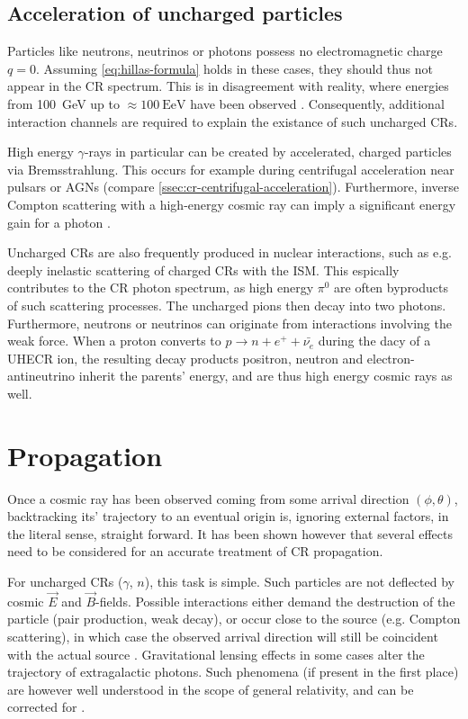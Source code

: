 \subsection{Acceleration of uncharged particles}
\label{ssec:cr-uncharged-acceleration}

Particles like neutrons, neutrinos or photons possess no electromagnetic charge $q = 0$. Assuming \autoref{eq:hillas-formula} holds in these cases, they 
should thus not appear in the CR spectrum. This is in disagreement with reality, where energies from \SI{100}{\giga\electronvolt} up to 
$\approx\SI{100}{\exa\electronvolt}$ have been observed \cite{abeysekara2018very, ishihara2016extremely}. Consequently, additional interaction channels are 
required to explain the existance of such uncharged CRs.

High energy $\gamma$-rays in particular can be created by accelerated, charged particles via Bremsstrahlung. This occurs for example during centrifugal 
acceleration near pulsars or AGNs (compare \autoref{ssec:cr-centrifugal-acceleration}). Furthermore, inverse Compton scattering with a high-energy cosmic ray can 
imply a significant energy gain for a photon \cite{jones1965inverse}.

Uncharged CRs are also frequently produced in nuclear interactions, such as e.g. deeply inelastic scattering of charged CRs with the ISM. This espically 
contributes to the CR photon spectrum, as high energy $\pi^0$ are often byproducts of such scattering processes. The uncharged pions then decay into two photons. 
Furthermore, neutrons or neutrinos can originate from interactions involving the weak force. When a proton converts to $p\rightarrow n+e^++\bar{\nu_e}$ during the 
dacy of a UHECR ion, the resulting decay products positron, neutron and electron-antineutrino inherit the parents' energy, and are thus high energy cosmic rays as 
well.

\section{Propagation}
\label{ssec:cr-propagation}

Once a cosmic ray has been observed coming from some arrival direction $(\phi, \theta)$, backtracking its' trajectory to an eventual origin is, ignoring external 
factors, in the literal sense, straight forward. It has been shown however that several effects need to be considered for an accurate treatment of CR propagation. 

For uncharged CRs ($\gamma$, $n$), this task is simple. Such particles are not deflected by cosmic $\vec{E}$ and $\vec{B}$-fields. Possible interactions either 
demand the destruction of the particle (pair production, weak decay), or occur close to the source (e.g. Compton scattering), in which case the observed arrival 
direction will still be coincident with the actual source \cite{fermi201398}. Gravitational lensing effects in some cases alter the trajectory of extragalactic 
photons. Such phenomena (if present in the first place) are however well understood in the scope of general relativity, and can be corrected for 
\cite{bartelmann2010gravitational, bartelmann2001weak}.

